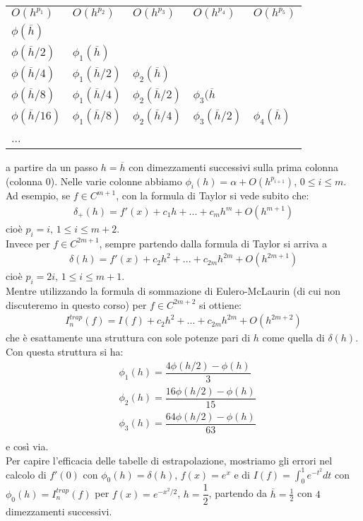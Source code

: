 \begin{table}[H]
\centering
\begin{tabular}{lllll}
$O(h^{p_{1}})$ & $O(h^{p_{2}})$ & $O(h^{p_{3}})$ & $O(h^{p_{4}})$ & $O(h^{p_{5}})$ \\  \cline{1-5} 

$\phi(\overline{h})$\\ 

$\phi (\overline{h}/2)$ & $\phi_1 (\overline{h})$\\

 $\phi (\overline{h}/4)$ & $\phi_1 (\overline{h}/2)$ & $\phi_2 (\overline{h})$\\
 $\phi (\overline{h}/8)$ & $\phi_1 (\overline{h}/4)$ & $\phi_2 (\overline{h}/2)$ & $\phi_3 (\overline{h}$\\
$\phi (\overline{h}/16)$ & $\phi_1 (\overline{h}/8)$ & $\phi_2 (\overline{h}/4)$ & $\phi_3 (\overline{h}/2)$ & $\phi_4 (\overline{h})$\\
	... 

\end{tabular}
\end{table}


a partire da un passo $h=\overline{h}$ con dimezzamenti successivi sulla prima colonna (colonna $0$). Nelle varie colonne abbiamo $\phi_i(h)=\alpha + O(h^{p_{i+1}})$, $0\leq i \leq m$.
Ad esempio, se $f \in C^{m+1}$, con la formula di Taylor si vede subito che:
\[ \begin{split}
	\delta_+ (h)=f'(x)+c_1h+...+c_mh^m+O(h^{m+1})
\end{split} \]
cioè $p_i=i, \, 1 \leq i \leq m+2$.\\
Invece per $f \in C^{2m+1}$, sempre partendo dalla formula di Taylor si arriva a 
\[ \begin{split}
	\delta (h)=f'(x)+c_2h^2+...+c_{2m}h^{2m}+O(h^{2m+1})
\end{split} \]
cioè $p_i=2i, \, 1 \leq i \leq m+1$.\\
Mentre utilizzando la formula di sommazione di Eulero-McLaurin (di cui non discuteremo in questo corso) per $f \in C^{2m+2}$ si ottiene:
\[ \begin{split}
	I_n^{trap} (f)=I(f)+c_2h^2+...+c_{2m}h^{2m}+O(h^{2m+2})
\end{split} \]
che è esattamente una struttura con sole potenze pari di $h$ come quella di $\delta(h)$. Con questa struttura si ha:
\[ \begin{split}
	& \phi_1(h)=\dfrac{4 \phi(h/2)-\phi(h)}{3}\\
	& \phi_2(h)=\dfrac{16 \phi(h/2)-\phi(h)}{15}\\
	& \phi_3(h)=\dfrac{64 \phi(h/2)-\phi(h)}{63}\\
\end{split} \]
e così via.\\
Per capire l'efficacia delle tabelle di estrapolazione, mostriamo gli errori nel calcolo di $f'(0)$ con $\phi_0(h)=\delta (h)$, $f(x)=e^x$ e di $I(f)=\int_0^1 e^{-t^2} dt$ con $\phi_0(h)=I_n^{trap} (f)$ per $f(x)=e^{-x^2/2}$, $h=\dfrac{1}{2}$, partendo da $\overline{h}=\frac{1}{2}$ con $4$ dimezzamenti successivi.
\\


